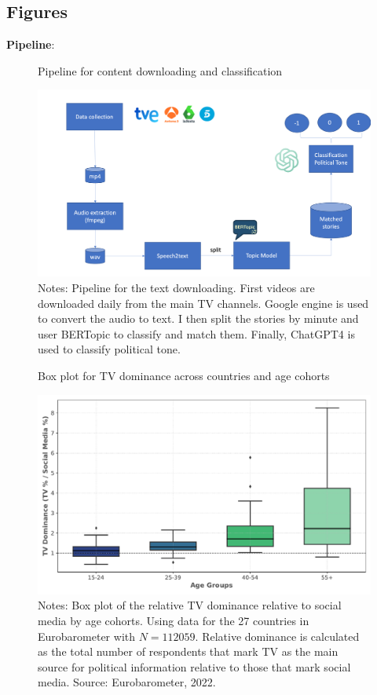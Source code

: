 \documentclass[12pt]{article}
\begin{document}
	
	
	
	
	
	
	
	
	
	\subsection{Figures}
	
	
	
	\textbf{Pipeline}:
	
	\begin{figure}[H]
		\centering
		\caption{Pipeline for content downloading and classification }
		\includegraphics[width=150mm]{figures/pipeline3}
		\caption*{\small Notes: Pipeline for the text downloading. First videos are downloaded daily from the main TV channels. Google engine is used to convert the audio to text. I then split the stories by minute and user BERTopic to classify and match them. Finally, ChatGPT4 is used to classify political tone.}
		\label{fig:pipeline}
	\end{figure}
	
	
	
	
	\begin{figure}[H]
		\centering
		\caption{Box plot for TV dominance across countries and age cohorts}
		\includegraphics[width=120mm]{figures/age_cohorts_full}
		\caption*{\small Notes: Box plot of the relative TV dominance relative to social media by age cohorts. Using data for the 27 countries in Eurobarometer with $N=112059.$ Relative dominance is calculated as the total number of respondents that mark TV as the main source for political information relative to those that mark social media. 
			Source: Eurobarometer, 2022. }
		\label{fig:motivation2}
	\end{figure}
	
\end{document}
